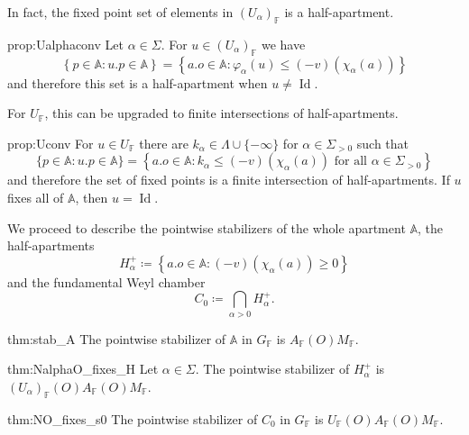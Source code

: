 \documentclass[12pt]{amsart}
\newcommand{\F}{\mathbb{F} }
\newcommand{\A}{\mathbb{A}}
\numberwithin{equation}{section}
\theoremstyle{remark} %
\begin{document}
In fact, the fixed point set of elements in $(U_\alpha)_\F$ is a half-apartment.

\begin{repproposition}{prop:Ualphaconv}
	Let $\alpha \in \Sigma$. For $u \in (U_\alpha)_\F$ we have
	$$
	\left\{ p \in \mathbb{A} \colon u.p  \in \mathbb{A}  \right\} = \left\{ a.o \in \A \colon \varphi_\alpha(u) \leq (-v)\left(\chi_\alpha\left(a\right)\right)  \right\}
	$$
	and therefore this set is a half-apartment when $u \neq \operatorname{Id}$. 
\end{repproposition}
 
 For $U_\F$, this can be upgraded to finite intersections of half-apartments.
 
 \begin{repproposition}{prop:Uconv}
 	For $u\in U_\F$ there are $k_\alpha \in \Lambda \cup \{-\infty \}$ for $\alpha \in \Sigma_{>0}$ such that
 	$$
 	\{p \in \A \colon u.p \in \A\} = \left\{ a.o \in \A \colon  k_\alpha \leq (-v)\left(\chi_\alpha \left(a\right)\right) \text{ for all } \alpha \in \Sigma_{>0}   \right\}
 	$$
 	and therefore the set of fixed points is a finite intersection of half-apartments. If $u$ fixes all of $\A$, then $u = \operatorname{Id}$. 
 \end{repproposition}
 
 We proceed to describe the pointwise stabilizers of the whole apartment $\A$, the half-apartments
 $$
 H_\alpha^+ \coloneq \left\{ a.o \in \A \colon (-v)(\chi_\alpha(a)) \geq 0 \right\}
 $$
 and the fundamental Weyl chamber
 $$
 C_0 \coloneq \bigcap_{\alpha >0} H_\alpha^+.
 $$
 
 \begin{reptheorem}{thm:stab_A}
 	The pointwise stabilizer of $\A$ in $G_\F$ is $ A_\F(O)M_\F$.
 \end{reptheorem}
\begin{reptheorem}{thm:NalphaO_fixes_H}
	Let $\alpha \in \Sigma$. The pointwise stabilizer of $
	H_\alpha^+ $ is $(U_\alpha)_\F(O) A_\F(O) M_\F$.
\end{reptheorem} %
\begin{reptheorem}{thm:NO_fixes_s0}
	The pointwise stabilizer of $C_0$ in $G_\F$ is 
	$U_\F(O)A_\F(O)M_\F.$
\end{reptheorem}
\end{document}

